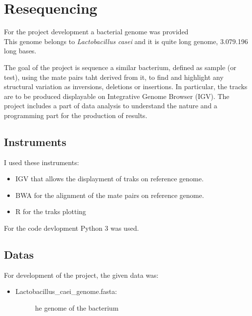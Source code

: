 
\chapter{Resequencing}
\label{cap:resequencing}

For the project development a bacterial genome was provided\\

This genome belongs to \emph{Lactobacillus casei} and it is quite long genome, 3.079.196 long bases.

The goal of the project is sequence a similar bacterium, defined as sample (or test), using the mate pairs taht derived from it, to find and highlight any structural variation as inversions, deletions or insertions. In particular, the tracks are to be produced displayable on Integrative Genome Browser (IGV).
The project includes a part of data analysis to understand the nature and a programming part for the production of results.

\section{Instruments}

I used these instruments:
\begin{itemize}
\item IGV that allows the displayment of traks on reference genome.
\item BWA for the alignment of the mate pairs on reference genome.
\item R for the traks plotting
\end{itemize}

For the code devlopment Python 3 was used.

\section{Datas}

For development of the project, the given data was:\\
    

\begin{itemize}
\item \begin{description}
		\item[Lactobacillus\_caei\_genome.fasta:] he genome of the bacterium
	  \end{description}
\end{itemize}

